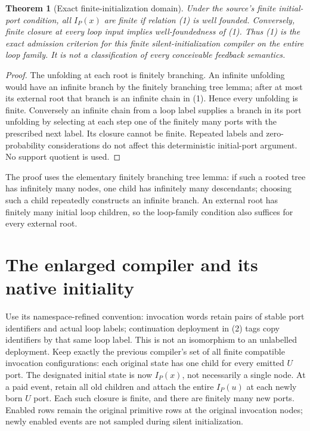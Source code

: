 \documentclass[11pt]{article}
\newtheorem{theorem}{Theorem}\newtheorem{proposition}[theorem]{Proposition}
\begin{document}
\begin{theorem}[Exact finite-initialization domain]
Under the source's finite initial-port condition, all $I_P(x)$ are finite if relation (1) is well founded. Conversely, finite closure at every loop input implies well-foundedness of (1). Thus (1) is the exact admission criterion for this finite silent-initialization compiler on the entire loop family. It is not a classification of every conceivable feedback semantics.
\end{theorem}
\begin{proof}
The unfolding at each root is finitely branching. An infinite unfolding would have an infinite branch by the finitely branching tree lemma; after at most its external root that branch is an infinite chain in (1). Hence every unfolding is finite. Conversely an infinite chain from a loop label supplies a branch in its port unfolding by selecting at each step one of the finitely many ports with the prescribed next label. Its closure cannot be finite. Repeated labels and zero-probability considerations do not affect this deterministic initial-port argument. No support quotient is used.
\end{proof}

The proof uses the elementary finitely branching tree lemma: if such a rooted tree has infinitely many nodes, one child has infinitely many descendants; choosing such a child repeatedly constructs an infinite branch. An external root has finitely many initial loop children, so the loop-family condition also suffices for every external root.

\section{The enlarged compiler and its native initiality}
Use its namespace-refined convention: invocation words retain pairs of stable port identifiers and actual loop labels; continuation deployment in (2) tags copy identifiers by that same loop label. This is not an isomorphism to an unlabelled deployment. Keep exactly the previous compiler's set of all finite compatible invocation configurations: each original state has one child for every emitted $U$ port. The designated initial state is now $I_P(x)$, not necessarily a single node. At a paid event, retain all old children and attach the entire $I_P(u)$ at each newly born $U$ port. Each such closure is finite, and there are finitely many new ports. Enabled rows remain the original primitive rows at the original invocation nodes; newly enabled events are not sampled during silent initialization.
\end{document}
